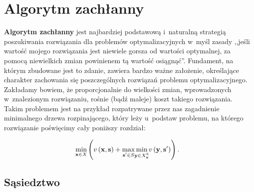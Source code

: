 \section{Algorytm zachłanny}

\textbf{Algorytm zachłanny} jest najbardziej podstawową i~naturalną strategią poszukiwania rozwiązania dla problemów optymalizacyjnych w~myśl zasady ,,jeśli wartość mojego rozwiązania jest niewiele gorsza od wartości optymalnej, za pomocą niewielkich zmian powinienem tą wartość osiągnąć''. Fundament, na którym zbudowane jest to zdanie, zawiera bardzo ważne założenie, określające charakter zachowania się poszczególnych rozwiązań problemu optymalizacyjnego. Zakładamy bowiem, że proporcjonalnie do wielkości zmian, wprowadzonych w~znalezionym rozwiązaniu, rośnie (bądź maleje) koszt takiego rozwiązania. Takim problemem jest na przykład rozpatrywane przez nas zagadnienie minimalnego drzewa rozpinającego, który leży u~podstaw problemu, na którego rozwiązanie poświęcimy cały poniższy rozdział:

\begin{equation}\label{eq:rrimst}
\min_{\mathclap{\textbf{x} \in X}} \left( v \left( \textbf{x}, \textbf{s} \right) + \max_{\mathclap{\textbf{s}^{\prime} \in S}} \min_{\mathclap{\textbf{y} \in X^{k}_{\textbf{x}}}} v \left( \textbf{y}, \textbf{s}^{\prime} \right) \right)\text{.}
\end{equation}
\vspace*{-20pt}
\subsection{Sąsiedztwo}


